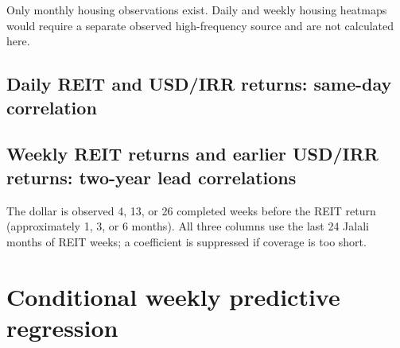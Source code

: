 \documentclass[11pt,a4paper]{article}
\begin{document}
Only monthly housing observations exist. Daily and weekly housing heatmaps would require a separate observed high-frequency source and are not calculated here.

\subsection{Daily REIT and USD/IRR returns: same-day correlation}

\begin{center}
\small
{}
\end{center}

\subsection{Weekly REIT returns and earlier USD/IRR returns: two-year lead correlations}

\begin{center}
\small
{}
\end{center}

The dollar is observed 4, 13, or 26 completed weeks before the REIT return (approximately 1, 3, or 6 months). All three columns use the last 24 Jalali months of REIT weeks; a coefficient is suppressed if coverage is too short.

\section{Conditional weekly predictive regression}
\end{document}
